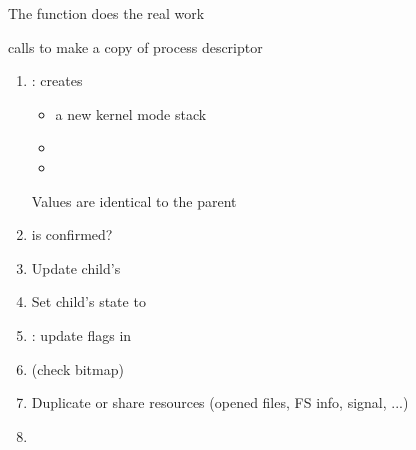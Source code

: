 \begin{frame}
  \begin{block}{The  function does the real work}
    \begin{center}
    \end{center}
  \end{block}
\end{frame}

\begin{frame}
  \begin{block}{ calls  to make a copy of
      process descriptor}
    \begin{center}
       
    \end{center}
  \end{block}
\end{frame}

\begin{frame}
  \begin{block}{}
    \begin{enumerate}
    \item {}: creates
      \begin{itemize}
      \item a new kernel mode stack
      \item {}
      \item {}
      \end{itemize}
      Values are identical to the parent
    \item is  confirmed?
    \item Update child's 
    \item Set child's state to 
    \item {}: update flags in 
     \item {} (check  bitmap)
    \item Duplicate or share resources (opened files, FS info, signal, ...)
    \item {}
    \end{enumerate}
  \end{block}
\end{frame}

